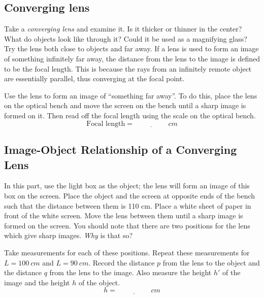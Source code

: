 \documentclass[11pt, a4paper]{article}
\begin{document}
\subsection{Converging lens}
Take a \textit{converging lens} and examine it.
Is it thicker or thinner in the center?
What do objects look like through it?
Could it be used as a magnifying glass?
Try the lens both close to objects and far away.
\fillwithlines{3cm}
If a lens is used to form an image of something infinitely far away, the
distance from the lens to the image is defined to be the focal length. 
This is because the rays from an infinitely remote object are essentially
parallel, thus converging at the focal point.

Use the lens to form an image of “something far away”. 
To do this, place the lens on the optical bench and move the screen on the
bench until a sharp image is formed on it. 
Then read off the focal length using the scale on the optical bench.
\begin{equation*}
    \text{Focal length} = \underline{\hspace{2cm}}\si{cm}
\end{equation*}

\subsection{Image-Object Relationship of a Converging Lens}
In this part, use the light box as the object; the lens will form an image of
this box on the screen.
Place the object and the screen at opposite ends of the bench such that the
distance between them is 110 cm.
Place a white sheet of paper in front of the white screen. 
Move the lens between them until a sharp image is formed on the screen.
You should note that there are two positions for the lens which give sharp
images. \textit{Why} is that so?
\fillwithlines{3cm}

Take measurements for each of these positions.
Repeat these measurements for $L = 100~\si{cm}$ and $L = 90~\si{cm}$.
Record the distance $p$ from the lens to the object and the distance
$q$ from the lens to the image.
Also measure the height $h'$ of the image and the height $h$
of the object.
\begin{equation*}
    h = \underline{\hspace{2cm}}\si{cm}
\end{equation*}
\end{document}
